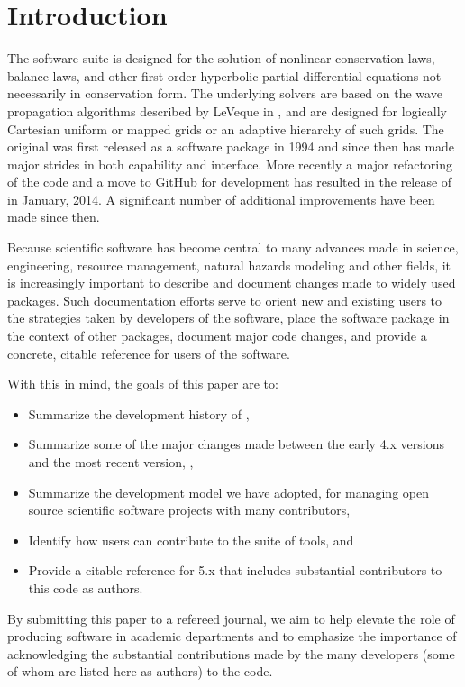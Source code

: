 %
%
%

\section{Introduction}\label{sec:intro}

The \clawpack software suite \cite{clawpack} is designed for the
solution of nonlinear conservation laws, balance laws, and other
first-order hyperbolic partial differential equations not necessarily
in conservation form.  The underlying solvers are based on the wave
propagation algorithms described by LeVeque in \cite{rjl:fvmhp}, and
are designed for logically Cartesian uniform or mapped grids or an
adaptive hierarchy of such grids.  The original \clawpack was first
released as a software package in 1994 and since then has made major
strides in both capability and interface. More recently a major
refactoring of the code and a move to GitHub for development has
resulted in the release of  in January, 2014. A
significant number of additional improvements have been made since
then.

Because scientific software  has become central to many advances made
in science, engineering, resource management, natural hazards modeling
and other fields, it is increasingly important to describe and
document changes made to widely used packages.  Such documentation efforts
serve to orient new and existing users to the  strategies
taken by developers of the software, place the software package in the context
of other packages, document major code changes, and provide a
concrete, citable reference for users of the software.

With this in mind, the goals of this paper are to:

\begin{itemize}
\item Summarize the development history of \clawpack,
\item Summarize some of the major changes made between the early \clawpack
4.x versions and the most recent version, ,
\item Summarize the development model we have adopted, for
managing open source scientific software
projects with many contributors,
\item Identify how users can contribute to the \clawpack suite of tools, and
\item Provide a citable reference for \clawpack 5.x that includes
substantial contributors to this code as authors.
\end{itemize}
By submitting this paper to a refereed journal, we aim to help elevate the role of
producing software in academic departments and to emphasize the
importance of acknowledging the substantial contributions
made by the many developers (some of whom are listed here as authors) to the
\clawpack code.

